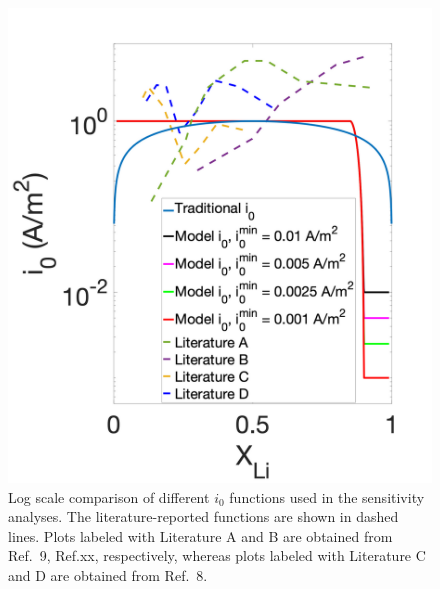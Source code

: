\documentclass{article}
\begin{document}
\begin{figure}
  \includegraphics{figures/i0_profiles.png}
  \caption{Log scale comparison of different $i_0$ functions used in
    the sensitivity analyses. The literature-reported functions are
    shown in dashed lines. Plots labeled with Literature A and B are
    obtained from Ref.\ 9, Ref.xx, respectively, whereas plots labeled
    with Literature C and D are obtained from Ref.\ 8.}
  \label{fig:i0_profiles}
\end{figure}
\end{document}
